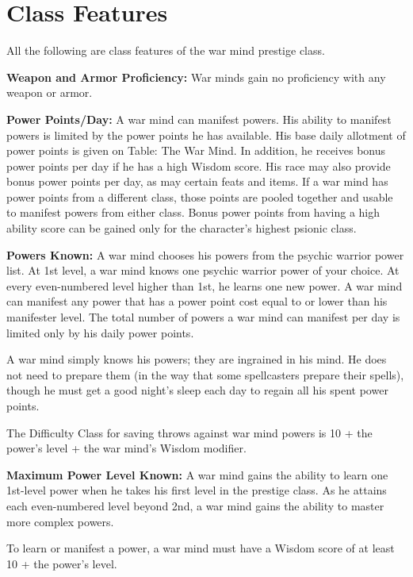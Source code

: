 \documentclass{article}
\begin{document}
\vspace{12pt}
\section*{\textbf{Class Features}}

All the following are class features of the war mind prestige class.

\textbf{Weapon and Armor Proficiency:} War minds gain no proficiency with any weapon 
or armor.

\textbf{Power Points/Day:} A war mind can manifest powers. His ability to manifest 
powers is limited by the power points he has available. His base daily allotment 
of power points is given on Table: The War Mind. In addition, he receives bonus 
power points per day if he has a high Wisdom score. His race may also provide bonus 
power points per day, as may certain feats and items. If a war mind has power points 
from a different class, those points are pooled together and usable to manifest 
powers from either class. Bonus power points from having a high ability score can 
be gained only for the character's highest psionic class.

\textbf{Powers Known:} A war mind chooses his powers from the psychic warrior power 
list. At 1st level, a war mind knows one psychic warrior power of your choice. 
At every even-numbered level higher than 1st, he learns one new power. A war mind 
can manifest any power that has a power point cost equal to or lower than his manifester 
level. The total number of powers a war mind can manifest per day is limited only 
by his daily power points.

A war mind simply knows his powers; they are ingrained in his mind. He does not 
need to prepare them (in the way that some spellcasters prepare their spells), 
though he must get a good night's sleep each day to regain all his spent power 
points.

The Difficulty Class for saving throws against war mind powers is 10 + the power's 
level + the war mind's Wisdom modifier.

\textbf{Maximum Power Level Known: }A war mind gains the ability to learn one 1st-level 
power when he takes his first level in the prestige class. As he attains each even-numbered 
level beyond 2nd, a war mind gains the ability to master more complex powers.

To learn or manifest a power, a war mind must have a Wisdom score of at least 10 
+ the power's level.
\end{document}
